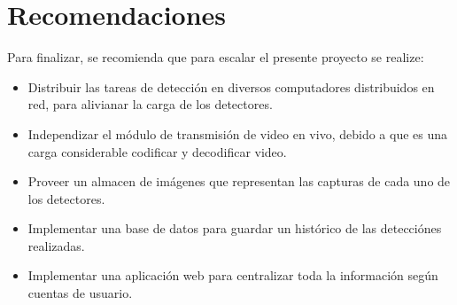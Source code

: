 \section{Recomendaciones}
Para finalizar, se recomienda que para escalar el presente proyecto se realize:
\begin{itemize}
    \item Distribuir las tareas de detección en diversos computadores distribuidos en red, para alivianar la carga de los detectores.
    \item Independizar el módulo de transmisión de video en vivo, debido a que es una carga considerable codificar y decodificar video.
    \item Proveer un almacen de imágenes que representan las capturas de cada uno de los detectores.
    \item Implementar una base de datos para guardar un histórico de las detecciónes realizadas.
    \item Implementar una aplicación web para centralizar toda la información según cuentas de usuario. 
\end{itemize}
